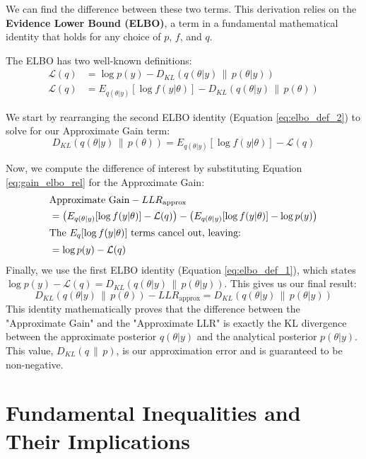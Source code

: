 \documentclass{article}
\theoremstyle{definition}
\begin{document}
We can find the difference between these two terms. This derivation relies on the \textbf{Evidence Lower Bound (ELBO)}, a term in a fundamental mathematical identity that holds for any choice of $p$, $f$, and $q$.

The ELBO has two well-known definitions:
\begin{align}
    \mathcal{L}(q) &= \log p(y) - D_{KL}(q(\theta|y) \,\|\, p(\theta|y)) \label{eq:elbo_def_1} \\
    \mathcal{L}(q) &= E_{q(\theta|y)}[\log f(y|\theta)] - D_{KL}(q(\theta|y) \,\|\, p(\theta)) \label{eq:elbo_def_2}
\end{align}

We start by rearranging the second ELBO identity (Equation \ref{eq:elbo_def_2}) to solve for our Approximate Gain term:
\begin{equation}
    D_{KL}(q(\theta|y) \,\|\, p(\theta)) = E_{q(\theta|y)}[\log f(y|\theta)] - \mathcal{L}(q) \label{eq:gain_elbo_rel}
\end{equation}

Now, we compute the difference of interest by substituting Equation \ref{eq:gain_elbo_rel} for the Approximate Gain:
\begin{align}
    & \text{Approximate Gain} - LLR_{\text{approx}} \\
    &= \left( E_{q(\theta|y)}[\log f(y|\theta)] - \mathcal{L}(q) \right) - \left( E_{q(\theta|y)}[\log f(y|\theta)] - \log p(y) \right) \\
    \intertext{The $E_{q}[\log f(y|\theta)]$ terms cancel out, leaving:}
    &= \log p(y) - \mathcal{L}(q)
\end{align}
Finally, we use the first ELBO identity (Equation \ref{eq:elbo_def_1}), which states $\log p(y) - \mathcal{L}(q) = D_{KL}(q(\theta|y) \,\|\, p(\theta|y))$.
This gives us our final result:
\begin{equation}
    D_{KL}(q(\theta|y) \,\|\, p(\theta)) - LLR_{\text{approx}} = D_{KL}(q(\theta|y) \,\|\, p(\theta|y))
\end{equation}
This identity mathematically proves that the difference between the "Approximate Gain" and the "Approximate LLR" is exactly the KL divergence between the approximate posterior $q(\theta|y)$ and the analytical posterior $p(\theta|y)$. This value, $D_{KL}(q \,\|\, p)$, is our approximation error and is guaranteed to be non-negative.



\section{Fundamental Inequalities and Their Implications}
\end{document}
